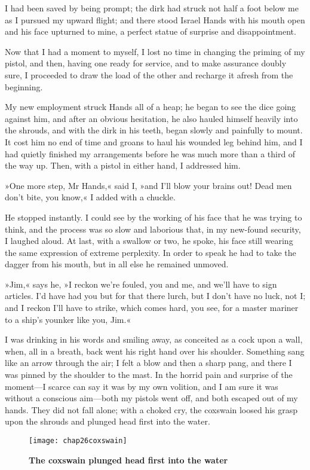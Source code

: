 I had been saved by being prompt; the dirk had struck not half a foot below me as I pursued my upward flight; and there stood Israel Hands with his mouth open and his face upturned to mine, a perfect statue of surprise and disappointment.

Now that I had a moment to myself, I lost no time in changing the priming of my pistol, and then, having one ready for service, and to make assurance doubly sure, I proceeded to draw the load of the other and recharge it afresh from the beginning.

My new employment struck Hands all of a heap; he began to see the dice going against him, and after an obvious hesitation, he also hauled himself heavily into the shrouds, and with the dirk in his teeth, began slowly and painfully to mount. It cost him no end of time and groans to haul his wounded leg behind him, and I had quietly finished my arrangements before he was much more than a third of the way up. Then, with a pistol in either hand, I addressed him.

»One more step, Mr Hands,« said I, »and I'll blow your brains out! Dead men don't bite, you know,« I added with a chuckle.

He stopped instantly. I could see by the working of his face that he was trying to think, and the process was so slow and laborious that, in my new-found security, I laughed aloud. At last, with a swallow or two, he spoke, his face still wearing the same expression of extreme perplexity. In order to speak he had to take the dagger from his mouth, but in all else he remained unmoved.

»Jim,« says he, »I reckon we're fouled, you and me, and we'll have to sign articles. I'd have had you but for that there lurch, but I don't have no luck, not I; and I reckon I'll have to strike, which comes hard, you see, for a master mariner to a ship's younker like you, Jim.«

I was drinking in his words and smiling away, as conceited as a cock upon a wall, when, all in a breath, back went his right hand over his shoulder. Something sang like an arrow through the air; I felt a blow and then a sharp pang, and there I was pinned by the shoulder to the mast. In the horrid pain and surprise of the moment—I scarce can say it was by my own volition, and I am sure it was without a conscious aim—both my pistols went off, and both escaped out of my hands. They did not fall alone; with a choked cry, the coxswain loosed his grasp upon the shrouds and plunged head first into the water.

    \begin{figure}[p]
\centering
\texttt{[image: chap26coxswain]}
\caption{\textbf{The coxswain plunged head first into the water}}
\end{figure}   